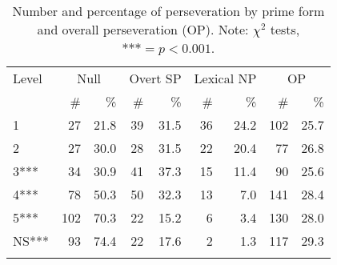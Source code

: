 \documentclass[output=paper]{langscibook}
\begin{document}
\begin{table}
\begin{tabular}{l *8{r}}
 \lsptoprule
 {Level}  & \multicolumn{2}{c}{Null} & \multicolumn{2}{c}{Overt SP} & \multicolumn{2}{c}{Lexical NP} & \multicolumn{2}{c}{OP}\\
 \cmidrule(lr){2-3}\cmidrule(lr){4-5}\cmidrule(lr){6-7}\cmidrule(lr){8-9}
 & \#  & \%  & \#  & \%  & \#  & \%  &  \# &  \%\\
 \midrule
 1  & 27  & 21.8  & 39  & 31.5  & 36  & 24.2  &  102 &  25.7\\
 2  & 27  & 30.0  & 28  & 31.5  & 22  & 20.4  &  77 &  26.8\\
 3***  & 34  & 30.9  & 41  & 37.3  & 15  & 11.4  &  90 &  25.6\\
 4***  & 78  & 50.3  & 50  & 32.3  & 13  & 7.0  &  141 &  28.4\\
 5***  & 102  & 70.3  & 22  & 15.2  & 6  & 3.4  &  130 &  28.0\\
 NS***  & 93  & 74.4  & 22  & 17.6  & 2  & 1.3  &  117 &  29.3\\
 \lspbottomrule
\end{tabular}
\caption{Number and percentage of perseveration by prime form and overall perseveration (OP). Note: $\chi^2$ tests, $\text{***} = p<0.001$.\label{tab:geeslin:8}}
\end{table}
\end{document}
